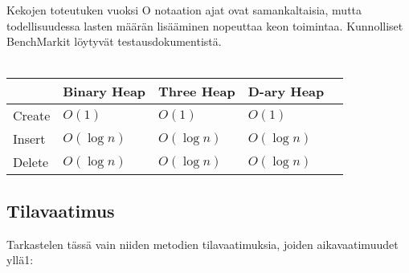 \documentclass[a4paper,12pt]{article}
\begin{document}
Kekojen toteutuken vuoksi O notaation ajat ovat samankaltaisia, mutta todellisuudessa lasten määrän lisääminen nopeuttaa keon toimintaa. Kunnolliset BenchMarkit löytyvät testausdokumentistä. \\\\
\begin{tabular}{|l|l|l|l|l|}
\hline
&Binary Heap & Three Heap & D-ary Heap \\\hline
Create & $O (1)$ & $O (1)$ & $O (1)$\\\hline
Insert & $O (\log n)$ & $O (\log n)$ & $O (\log n)$\\\hline
Delete  & $O (\log n)$ & $O (\log n)$ & $O (\log n)$\\\hline

\end{tabular}

\subsection{Tilavaatimus}
Tarkastelen tässä vain niiden metodien tilavaatimuksia, joiden aikavaatimuudet yllä1:
\end{document}

